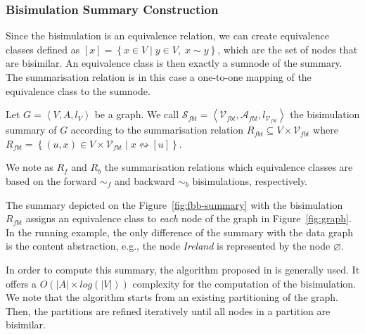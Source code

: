 \subsubsection{Bisimulation Summary Construction}

Since the bisimulation is an equivalence relation, we can create equivalence classes defined as $[x] = \left\lbrace x \in V \mid y \in V,\; x \sim y \right\rbrace$, which are the set of nodes that are bisimilar. An equivalence class is then exactly a sumnode of the summary. The summarisation relation is in this case a one-to-one mapping of the equivalence class to the sumnode.

\begin{definition}
Let $G=\left\langle V, A, l_V \right\rangle$ be a graph. We call $\mathcal{S}_{fbt} = \left\langle \mathcal{V}_{fbt}, \mathcal{A}_{fbt}, l_{\mathcal{V}_{fbt}} \right\rangle$ the bisimulation summary of $G$ according to the summarisation relation $R_{fbt} \subseteq V \times \mathcal{V}_{fbt}$ where $R_{fbt} = \left\lbrace \left( u, x \right) \in V \times \mathcal{V}_{fbt} \mid x \leftrightsquigarrow [u] \right\rbrace$.
\end{definition}

\begin{remark}
We note as $R_f$ and $R_b$ the summarisation relations which equivalence classes are based on the forward $\sim_f$ and backward $\sim_b$ bisimulations, respectively.
\end{remark}

The summary depicted on the Figure~\ref{fig:fbb-summary} with the bisimulation $R_{fbt}$ assigns an equivalence class to \emph{each} node of the graph in Figure~\ref{fig:graph}. In the running example, the only difference of the summary with the data graph is the content abstraction, e.g., the node \emph{Ireland} is represented by the node $\varnothing$.

In order to compute this summary, the algorithm proposed in \cite{Paige:1987:TPR:37185.37186} is generally used. It offers a $O\left( \vert A \vert \times log\left( \vert V \vert \right) \right)$ complexity for the computation of the bisimulation. We note that the algorithm starts from an existing partitioning of the graph. Then, the partitions are refined iteratively until all nodes in a partition are bisimilar.%

